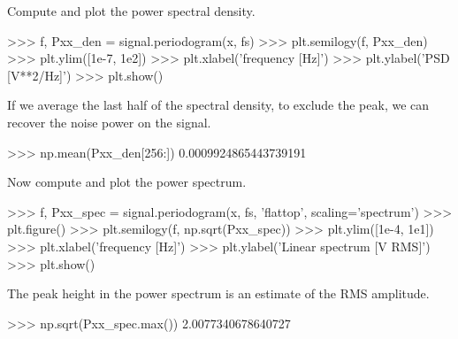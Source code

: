 \begin{DoxyVerb}
Compute and plot the power spectral density.

>>> f, Pxx_den = signal.periodogram(x, fs)
>>> plt.semilogy(f, Pxx_den)
>>> plt.ylim([1e-7, 1e2])
>>> plt.xlabel('frequency [Hz]')
>>> plt.ylabel('PSD [V**2/Hz]')
>>> plt.show()

If we average the last half of the spectral density, to exclude the
peak, we can recover the noise power on the signal.

>>> np.mean(Pxx_den[256:])
0.0009924865443739191

Now compute and plot the power spectrum.

>>> f, Pxx_spec = signal.periodogram(x, fs, 'flattop', scaling='spectrum')
>>> plt.figure()
>>> plt.semilogy(f, np.sqrt(Pxx_spec))
>>> plt.ylim([1e-4, 1e1])
>>> plt.xlabel('frequency [Hz]')
>>> plt.ylabel('Linear spectrum [V RMS]')
>>> plt.show()

The peak height in the power spectrum is an estimate of the RMS amplitude.

>>> np.sqrt(Pxx_spec.max())
2.0077340678640727\end{DoxyVerb}
 \hypertarget{namespacescipy_1_1signal_1_1spectral_a31306dc6d64cbd234911b2633b1e4ad3}{}
